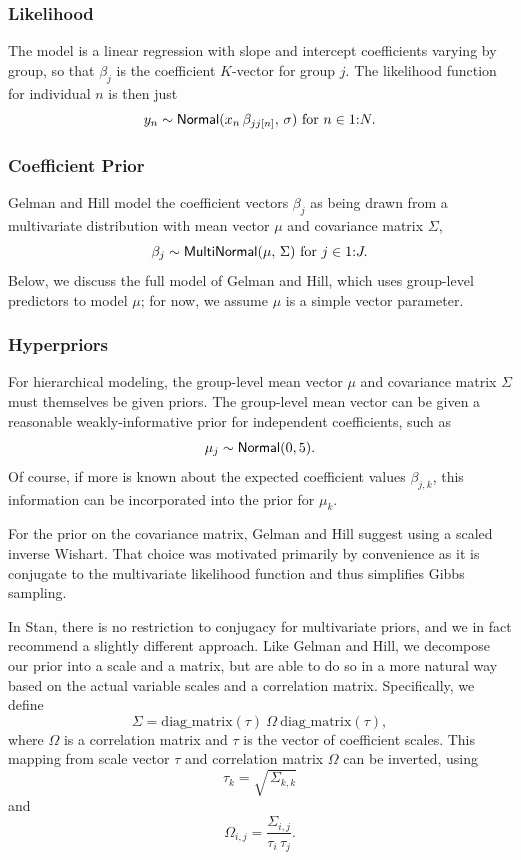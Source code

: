 \subsubsection{Likelihood}

The model is a linear regression with slope and intercept coefficients
varying by group, so that $\beta_j$ is the coefficient $K$-vector for
group $j$.  The likelihood function for individual $n$ is then just
%
\[
y_n \sim \mbox{\sf Normal}(x_n \, \beta_{jj[n]}, \, \sigma)
\mbox{ for } n \in 1{:}N.
\]
%

\subsubsection{Coefficient Prior}

Gelman and Hill model the coefficient vectors $\beta_j$ as being drawn
from a multivariate distribution with mean vector $\mu$ and
covariance matrix $\Sigma$,%
%
\[
\beta_j \sim \mbox{\sf MultiNormal}(\mu, \, \Sigma)
\mbox{ for } j \in 1{:}J.
\]
%
Below, we discuss the full model of Gelman and Hill, which uses
group-level predictors to model $\mu$; for now, we assume $\mu$ is a
simple vector parameter.

\subsubsection{Hyperpriors}

For hierarchical modeling, the group-level mean vector $\mu$ and
covariance matrix $\Sigma$ must themselves be given priors.  The
group-level mean vector can be given a reasonable weakly-informative
prior for independent coefficients, such as
%
\[
\mu_j \sim \mbox{\sf Normal}(0,5).
\]
Of course, if more is known about the expected coefficient values
$\beta_{j, k}$, this information can be incorporated into the prior for
$\mu_k$.

For the prior on the covariance matrix, Gelman and Hill suggest using
a scaled inverse Wishart.  That choice was motivated primarily by
convenience as it is conjugate to the multivariate likelihood function
and thus simplifies Gibbs sampling.

In Stan, there is no restriction to conjugacy for multivariate priors,
and we in fact recommend a slightly different approach.  Like Gelman
and Hill, we decompose our prior into a scale and a matrix, but are
able to do so in a more natural way based on the actual variable
scales and a correlation matrix.  Specifically, we define
\[
\Sigma = \mbox{diag\_matrix}(\tau) \ \Omega \ \mbox{diag\_matrix}(\tau),
\]
where $\Omega$ is a correlation matrix and $\tau$ is the vector of
coefficient scales.   This mapping from scale vector $\tau$ and
correlation matrix $\Omega$ can be inverted, using
\[
\tau_k = \sqrt{\, \Sigma_{k,k}}
\]
and
\[
\Omega_{i, j} = \frac{\Sigma_{i, j}}{\tau_i \, \tau_j}.
\]

